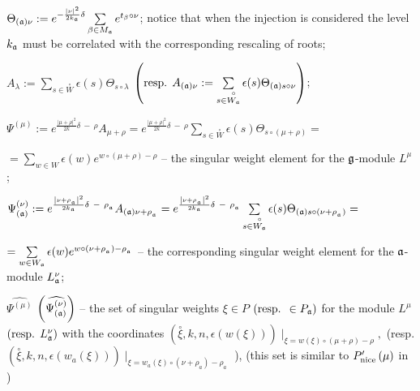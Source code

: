 \documentclass[a4paper,12pt]{article}
\theoremstyle{definition} \newtheorem{Def}{Definition}
\begin{document}
$\Theta _{\left( \frak{a}\right) \nu }:=e^{-\frac{\left| \nu \right| ^{2}}{%
2k_{\frak{a}}}\delta }\sum\limits_{\beta \in M_{\frak{a}}}e^{t_{\beta }\circ
\nu }$;\newline
notice that when the injection is considered the level $k_{\frak{a}}$ must
be correlated with the corresponding rescaling of roots;

$A_{\lambda }:=\sum\limits_{s\in \overset{\circ }{W}}\epsilon (s)\Theta
_{s\circ \lambda }$ $\left( \text{resp. }A_{\left( \frak{a}\right) \nu
}:=\sum\limits_{s\in \overset{\circ }{W_{\frak{a}}}}\epsilon (s)\Theta
_{\left( \frak{a}\right) s\circ \nu }\right) $;

$\Psi ^{\left( \mu \right) }:=e^{\frac{\left| \mu +\rho \right| ^{2}}{2k}%
\delta \ -\ \rho }A_{\mu +\rho }=e^{\frac{\left| \mu +\rho \right| ^{2}}{2k}%
\delta \ -\ \rho }\sum\limits_{s\in \overset{\circ }{W}}\epsilon (s)\Theta
_{s\circ \left( \mu +\rho \right) }=$

\noindent $=\sum\limits_{w\in W}\epsilon (w)e^{w\circ (\mu +\rho )-\rho }$
-- the singular weight element for the $\frak{g}$-module $L^{\mu }$;

$\Psi _{\left( \frak{a}\right) }^{\left( \nu \right) }:=e^{\frac{\left| \nu
+\rho _{_{\frak{a}}}\right| ^{2}}{2k_{\frak{a}}}\delta \ -\ \rho _{_{\frak{a}%
}}}A_{\left( \frak{a}\right) \nu +\rho _{_{\frak{a}}}}=e^{\frac{\left| \nu
+\rho _{_{\frak{a}}}\right| ^{2}}{2k_{\frak{a}}}\delta \ -\ \rho _{_{\frak{a}%
}}}\sum\limits_{s\in \overset{\circ }{W_{\frak{a}}}}\epsilon (s)\Theta
_{\left( \frak{a}\right) s\circ \left( \nu +\rho _{_{\frak{a}}}\right) }=$

\noindent $=\sum\limits_{w\in W_{\frak{a}}}\epsilon (w)e^{w\circ (\nu +\rho
_{_{\frak{a}}})-\rho _{_{\frak{a}}}}$ -- the corresponding singular weight
element for the $\frak{a}$-module $L_{\frak{a}}^{\nu }$;

$\widehat{\Psi ^{\left( \mu \right) }}$ $\left( \widehat{\Psi _{\left( \frak{%
a}\right) }^{\left( \nu \right) }}\right) $ -- the set of singular weights $%
\xi \in P$ $\left( \text{resp. }\in P_{\frak{a}}\right) $ for the module $%
L^{\mu }$ $\left( \text{resp. }L_{\frak{a}}^{\nu }\right) $ with the
coordinates $\left( \overset{\circ }{\xi },k,n,\epsilon \left( w\left( \xi
\right) \right) \right) \mid _{\xi =w\left( \xi \right) \circ (\mu +\rho
)-\rho },$ (resp. $\left( \overset{\circ }{\xi },k,n,\epsilon \left(
w_{a}\left( \xi \right) \right) \right) \mid _{\xi =w_{a}\left( \xi \right)
\circ (\nu +\rho _{a})-\rho _{a}}$ ), (this set is similar to $P_{\mathrm{%
nice}}^{\prime }\left( \mu \right) $ in \cite{Wak1})
\end{document}
